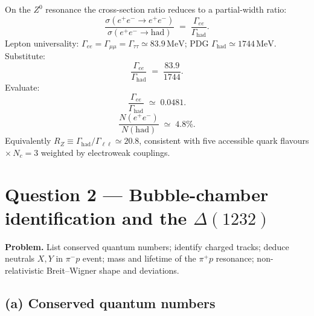 \documentclass[11pt]{article}
\begin{document}
On the $Z^{0}$ resonance the cross-section ratio reduces to a partial-width ratio:
\[
\frac{\sigma(e^{+}e^{-}\to e^{+}e^{-})}{\sigma(e^{+}e^{-}\to\text{had})}\;=\;\frac{\Gamma_{ee}}{\Gamma_\text{had}}.
\]
Lepton universality: $\Gamma_{ee}=\Gamma_{\mu\mu}=\Gamma_{\tau\tau}\simeq 83.9\,\text{MeV}$; PDG $\Gamma_\text{had}\simeq 1744\,\text{MeV}$. Substitute:
\[
\frac{\Gamma_{ee}}{\Gamma_\text{had}}\;=\;\frac{83.9}{1744}.
\]
Evaluate:
\[
\frac{\Gamma_{ee}}{\Gamma_\text{had}}\;\simeq\;0.0481.
\]
\begin{equation}
\boxed{\;\frac{N(e^{+}e^{-})}{N(\text{had})}\;\simeq\;4.8\%.\;}
\end{equation}
Equivalently $R_{Z}\equiv\Gamma_\text{had}/\Gamma_{\ell\ell}\simeq 20.8$, consistent with five accessible quark flavours $\times\,N_{c}=3$ weighted by electroweak couplings.

\section*{Question 2 --- Bubble-chamber identification and the $\Delta(1232)$}

\textbf{Problem.} List conserved quantum numbers; identify charged tracks; deduce neutrals $X,Y$ in $\pi^{-}p$ event; mass and lifetime of the $\pi^{+}p$ resonance; non-relativistic Breit--Wigner shape and deviations.

\subsection*{(a) Conserved quantum numbers}
\end{document}
